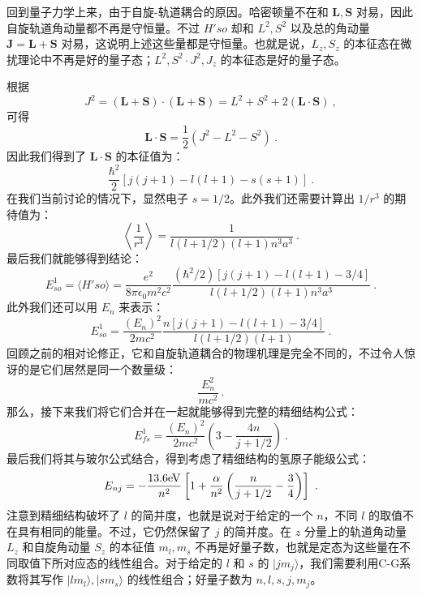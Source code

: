 回到量子力学上来，由于自旋-轨道耦合的原因。哈密顿量不在和 $\mathbf{L,S}$ 对易，因此自旋轨道角动量都不再是守恒量。不过 $H'{so}$ 却和 $L^2,S^2$ 以及总的角动量 $\mathbf{J=L+S}$ 对易，这说明上述这些量都是守恒量。也就是说，$L_z,S_z$ 的本征态在微扰理论中不再是好的量子态；$L^2,S^2\cdot J^2,J_z$ 的本征态是好的量子态。

根据
\begin{equation}
J^2 = (\mathbf{L+S})\cdot(\mathbf{L+S})=L^2+S^2+2(\mathbf{L\cdot S})~,
\end{equation}
可得
\begin{equation}
\mathbf{L\cdot S}=\frac{1}{2}(J^2-L^2-S^2)~.
\end{equation}
因此我们得到了 $\mathbf{L\cdot S}$ 的本征值为：
\begin{equation}
\frac{\hbar^2}{2}[j(j+1)-l(l+1)-s(s+1)]~.
\end{equation}
在我们当前讨论的情况下，显然电子 $s=1/2$。此外我们还需要计算出 $1/r^3$ 的期待值为：
\begin{equation}
\left\langle \frac{1}{r^3}\right\rangle = \frac{1}{l(l+1/2)(l+1)n^3a^3}~.
\end{equation}
最后我们就能够得到结论：
\begin{equation}
E^1_{so}=\langle H'{so}\rangle = \frac{e^2}{8\pi \epsilon_0 m^2 c^2}\frac{(\hbar^2/2)[j(j+1)-l(l+1)-3/4]}{l(l+1/2)(l+1)n^3a^3}~.
\end{equation}
此外我们还可以用 $E_n$ 来表示：
\begin{equation}
E^1_{so}=\frac{(E_n)^2}{2mc^2}\frac{n[j(j+1)-l(l+1)-3/4]}{l(l+1/2)(l+1)}~.
\end{equation}
回顾之前的相对论修正，它和自旋轨道耦合的物理机理是完全不同的，不过令人惊讶的是它们居然是同一个数量级：
\begin{equation}
\frac{E_n^2}{mc^2}~.
\end{equation}
那么，接下来我们将它们合并在一起就能够得到完整的精细结构公式：
\begin{equation}
E_{fs}^1=\frac{(E_n)^2}{2mc^2}\left(3-\frac{4n}{j+1/2}\right)~.
\end{equation}
最后我们将其与玻尔公式结合，得到考虑了精细结构的氢原子能级公式：
\begin{equation}
E_{nj}=-\frac{13.6\rm{eV}}{n^2}\left[1+\frac{\alpha}{n^2}\left(\frac{n}{j+1/2}-\frac{3}{4}\right)\right]~.
\end{equation}
注意到精细结构破坏了 $l$ 的简并度，也就是说对于给定的一个 $n$，不同 $l$ 的取值不在具有相同的能量。不过，它仍然保留了 $j$ 的简并度。在 $z$ 分量上的轨道角动量 $L_z$ 和自旋角动量 $S_z$ 的本征值 $m_l,m_s$ 不再是好量子数，也就是定态为这些量在不同取值下所对应态的线性组合。对于给定的 $l$ 和 $s$ 的 $|jm_j\rangle$，我们需要利用C-G系数将其写作 $|lm_l\rangle,|sm_s\rangle$ 的线性组合；好量子数为 $n,l,s,j,m_j$。





